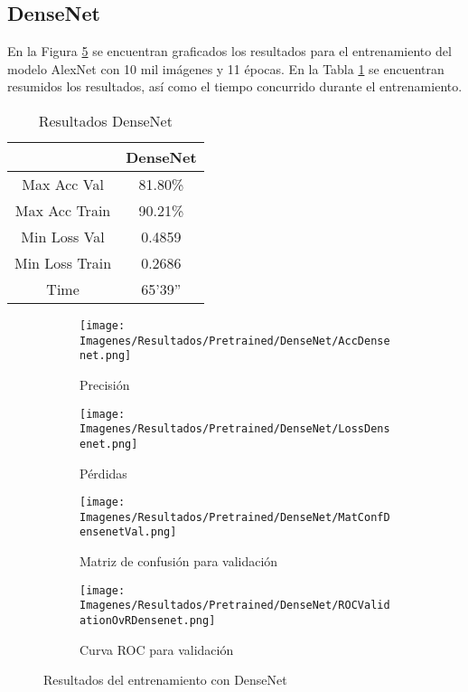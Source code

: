 \documentclass{report}
\begin{document}
\newpage
\subsection{DenseNet}


En la Figura \ref{fig:RDenseNet} se encuentran graficados los resultados para el entrenamiento del modelo AlexNet con 10 mil imágenes y 11 épocas. En la Tabla \ref{tab:RDenseNet} se encuentran resumidos los resultados, así como el tiempo concurrido durante el entrenamiento.


\begin{table}[H]
\centering
\begin{tabular}{|c|c|}
\hline
\cellcolor[HTML]{FFFFFF}{\color[HTML]{000000} Modelo} & DenseNet \\ \hline
Max Acc Val                                           & 81.80\%        \\ \hline
Max Acc Train                                         & 90.21\%        \\ \hline
Min Loss Val                                          & 0.4859        \\ \hline
Min Loss Train                                        & 0.2686        \\ \hline
Time                                                  & 65'39''        \\ \hline
\end{tabular}
\caption{Resultados DenseNet}
\label{tab:RDenseNet}
\end{table}


\vspace{0.4cm}
\begin{figure}[H]
	 	\centering
	 	\begin{subfigure}[b]{0.45\linewidth}
	 	\centering
	 		\texttt{[image: Imagenes/Resultados/Pretrained/DenseNet/AccDensenet.png]}
	 		\caption{ Precisión }
                    \label{fig:DensePrecision}
	 	\end{subfigure}
	 	\begin{subfigure}[b]{0.45\linewidth}
	 	\centering
	 		\texttt{[image: Imagenes/Resultados/Pretrained/DenseNet/LossDensenet.png]}
                    \caption{ Pérdidas }
                    \label{fig:DenseLoss}
	 	\end{subfigure}
	 	\centering
	 	\begin{subfigure}[b]{0.45\linewidth}
	 	\centering
	 		\texttt{[image: Imagenes/Resultados/Pretrained/DenseNet/MatConfDensenetVal.png]}
	 		\caption{ Matriz de confusión para validación }
                    \label{fig:DenseMatConf}
	 	\end{subfigure}
	 	\centering
	 	\begin{subfigure}[b]{0.45\linewidth}
	 	\centering
	 		\texttt{[image: Imagenes/Resultados/Pretrained/DenseNet/ROCValidationOvRDensenet.png]}
	 		\caption{ Curva ROC para validación }
                    \label{fig:DensenetCurvaROC}
	 	\end{subfigure}
	 	\caption{ Resultados del entrenamiento con DenseNet}
	 	\label{fig:RDenseNet}
\end{figure}
\end{document}
